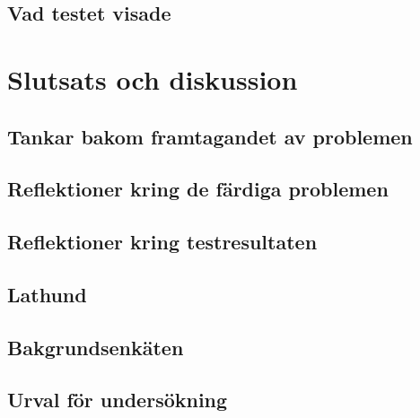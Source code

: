 \documentclass[11pt,a4paper]{article}
\begin{document}
    \subsection{Vad testet visade}
    \label{sec:slutenkat}
    

\section{Slutsats och diskussion}
    

    \subsection{Tankar bakom framtagandet av problemen}
        \label{sec:tankarbakomprob}
        
        
        
        
    \subsection{Reflektioner kring de färdiga problemen}
        

    \subsection{Reflektioner kring testresultaten}
        
    
    \subsection{Lathund}
        
    
    \subsection{Bakgrundsenkäten}
        
    
    \subsection{Urval för undersökning}
        
        
\end{document}
